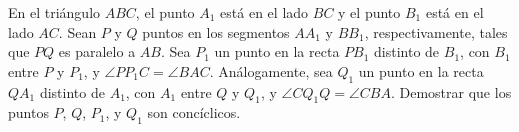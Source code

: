 En el triángulo $ABC$, el punto $A_1$ está en el lado $BC$ y el punto $B_1$ está en el lado $AC$. Sean $P$ y $Q$ puntos en los segmentos $AA_1$ y $BB_1$, respectivamente, tales que $PQ$ es paralelo a $AB$. Sea $P_1$ un punto en la recta $PB_1$ distinto de $B_1$, con $B_1$ entre $P$ y $P_1$, y $\angle PP_1C = \angle BAC$. Análogamente, sea $Q_1$ un punto en la recta $QA_1$ distinto de $A_1$, con $A_1$ entre $Q$ y $Q_1$, y $\angle CQ_1Q = \angle CBA$.
Demostrar que los puntos $P$, $Q$, $P_1$, y $Q_1$ son concíclicos.
